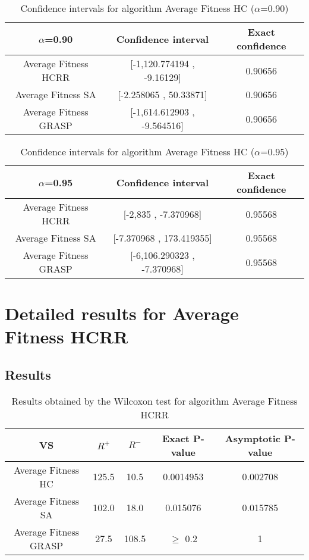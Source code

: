 \documentclass[a4paper,10pt]{article}
\begin{document}
\begin{table}[!htp]
\centering\small
\begin{tabular}{
|c|c|c|}
\hline
 $\alpha$=0.90 & Confidence interval & Exact confidence \\ \hline 
Average Fitness HCRR    & [-1,120.774194 , -9.16129] & 0.90656\\ \hline 
Average Fitness SA      & [-2.258065 , 50.33871] & 0.90656\\ \hline 
Average Fitness GRASP & [-1,614.612903 , -9.564516] & 0.90656\\ \hline 

\end{tabular}
\caption{Confidence intervals for algorithm Average Fitness HC       ($\alpha$=0.90)}
\end{table}
\begin{table}[!htp]
\centering\small
\begin{tabular}{
|c|c|c|}
\hline
 $\alpha$=0.95 & Confidence interval & Exact confidence \\ \hline 
Average Fitness HCRR    & [-2,835 , -7.370968] & 0.95568\\ \hline 
Average Fitness SA      & [-7.370968 , 173.419355] & 0.95568\\ \hline 
Average Fitness GRASP & [-6,106.290323 , -7.370968] & 0.95568\\ \hline 

\end{tabular}
\caption{Confidence intervals for algorithm Average Fitness HC       ($\alpha$=0.95)}
\end{table}

 \clearpage 


\section{Detailed results for Average Fitness HCRR   }


\subsection{Results}

\begin{table}[!htp]
\centering\small
\begin{tabular}{
|c|c|c|c|c|}
\hline
 VS & $R^{+}$ & $R^{-}$ & Exact P-value & Asymptotic P-value \\ \hline 
Average Fitness HC       & 125.5 & 10.5 & 0.0014953 & 0.002708\\ \hline 
Average Fitness SA      & 102.0 & 18.0 & 0.015076 & 0.015785\\ \hline 
Average Fitness GRASP & 27.5 & 108.5 & $\geq$ 0.2 & 1\\ \hline 

\end{tabular}
\caption{Results obtained by the Wilcoxon test for algorithm Average Fitness HCRR   }
\end{table}
\end{document}
